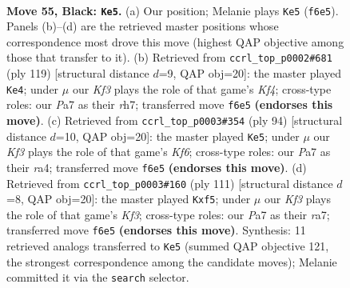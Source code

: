 \documentclass[11pt]{article}
\begin{document}
\clearpage

\begin{figure}[p]\centering
\begin{subfigure}{0.46\textwidth}\centering
\resizebox{\linewidth}{!}{%
\newchessgame
\chessboard[
  setfen={8/p2p4/2p2k2/5P2/2r5/6K1/8/8 b - - 12 55},
  showmover=false,
  pgfstyle=straightmove, color=movearrow, markmove={f6-e5}
]}
\caption{}
\end{subfigure}\hfill
\begin{subfigure}{0.46\textwidth}\centering
\resizebox{\linewidth}{!}{%
\newchessgame
\chessboard[
  setfen={8/7R/8/p4k2/5P2/r7/5K2/8 b - - 22 60},
  showmover=false,
  pgfstyle=straightmove, color=movearrow, markmove={f5-e4}
]}
\caption{}
\end{subfigure}
\\[4pt]
\begin{subfigure}{0.46\textwidth}\centering
\resizebox{\linewidth}{!}{%
\newchessgame
\chessboard[
  setfen={8/5p2/5K1k/8/r4P2/6RP/8/8 w - - 8 48},
  showmover=false,
  pgfstyle=straightmove, color=movearrow, markmove={f6-e5}
]}
\caption{}
\end{subfigure}\hfill
\begin{subfigure}{0.46\textwidth}\centering
\resizebox{\linewidth}{!}{%
\newchessgame
\chessboard[
  setfen={3r4/R7/5k2/2pp1P2/8/3P1K2/8/8 b - - 0 56},
  showmover=false,
  pgfstyle=straightmove, color=movearrow, markmove={f6-f5}
]}
\caption{}
\end{subfigure}
\caption{\textbf{Move 55, Black: \texttt{Ke5}.} (a) Our position; Melanie plays \texttt{Ke5} (\texttt{f6e5}). Panels (b)--(d) are the retrieved master positions whose correspondence most drove this move (highest QAP objective among those that transfer to it). (b) Retrieved from \texttt{ccrl\_top\_p0002\#681} (ply 119) [structural distance $d$=9, QAP obj=20]: the master played \texttt{Ke4}; under $\mu$ our \emph{Kf3} plays the role of that game's \emph{Kf4}; cross-type roles: our \emph{P}a7 as their \emph{r}h7; transferred move \texttt{f6e5} \textbf{(endorses this move)}. (c) Retrieved from \texttt{ccrl\_top\_p0003\#354} (ply 94) [structural distance $d$=10, QAP obj=20]: the master played \texttt{Ke5}; under $\mu$ our \emph{Kf3} plays the role of that game's \emph{Kf6}; cross-type roles: our \emph{P}a7 as their \emph{r}a4; transferred move \texttt{f6e5} \textbf{(endorses this move)}. (d) Retrieved from \texttt{ccrl\_top\_p0003\#160} (ply 111) [structural distance $d$=8, QAP obj=20]: the master played \texttt{Kxf5}; under $\mu$ our \emph{Kf3} plays the role of that game's \emph{Kf3}; cross-type roles: our \emph{P}a7 as their \emph{r}a7; transferred move \texttt{f6e5} \textbf{(endorses this move)}. Synthesis: 11 retrieved analogs transferred to \texttt{Ke5} (summed QAP objective 121, the strongest correspondence among the candidate moves); Melanie committed it via the \texttt{search} selector.}
\label{fig:thought-m109}
\end{figure}
\end{document}
